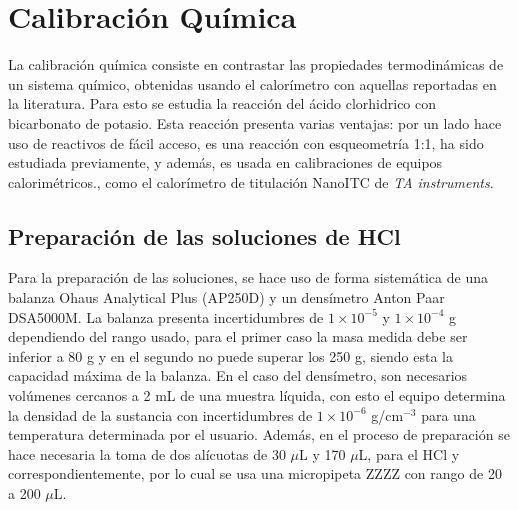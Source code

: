 
%




\chapter{Calibraci\'on Qu\'imica}
	La calibraci\'on qu\'imica consiste en contrastar las propiedades termodin\'amicas de un sistema qu\'imico, obtenidas usando el calor\'imetro con aquellas reportadas en la literatura. Para esto se estudia la reacci\'on del \'acido clorhidrico con bicarbonato de potasio. Esta reacci\'on presenta varias ventajas: por un lado hace uso de reactivos de f\'acil acceso, es una reacci\'on con esqueometr\'ia 1:1, ha sido estudiada previamente, y adem\'as, es usada en calibraciones de equipos calorim\'etricos., como el calor\'imetro de titulaci\'on NanoITC de \textit{TA instruments}.
	
\section{Preparaci\'on de las soluciones de HCl}\label{sec: soluciones}
	Para la preparaci\'on de las soluciones, se hace uso de forma sistem\'atica de una balanza Ohaus Analytical Plus (AP250D) y un dens\'imetro Anton Paar DSA5000M. La balanza presenta incertidumbres de $1\times10^{-5}$ y $1\times10^{-4}$ g dependiendo del rango usado, para el primer caso la masa medida debe ser inferior a 80 g y en el segundo no puede superar los 250 g, siendo esta la capacidad máxima de la balanza. En el caso del densímetro, son necesarios volúmenes cercanos a 2 mL de una muestra líquida, con esto el equipo determina la densidad de la sustancia con incertidumbres de $1\times10^{-6}$ g/cm$^{-3}$ para una temperatura determinada por el usuario. Adem\'as, en el proceso de preparaci\'on se hace necesaria la toma de dos al\'icuotas de 30 $\mu$L y 170 $\mu$L, para el HCl y  correspondientemente, por lo cual se usa una micropipeta ZZZZ con rango de 20 a 200 $\mu$L.
	
